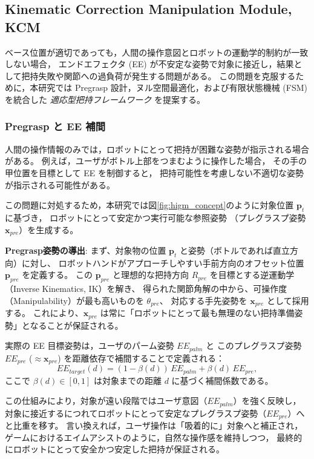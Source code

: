 \documentclass[../../main.tex]{subfiles} %
\begin{document}
\subsection{Kinematic Correction Manipulation Module, KCM}

ベース位置が適切であっても，人間の操作意図とロボットの運動学的制約が一致しない場合，
エンドエフェクタ (EE) が不安定な姿勢で対象に接近し，結果として把持失敗や関節への過負荷が発生する問題がある。
この問題を克服するために，本研究では Pregrasp 設計，ヌル空間最適化，および有限状態機械 (FSM) を統合した
\textit{適応型把持フレームワーク} を提案する。

\subsubsection{Pregrasp と EE 補間}
人間の操作情報のみでは，ロボットにとって把持が困難な姿勢が指示される場合がある。
例えば，ユーザがボトル上部をつまむように操作した場合，
その手の甲位置を目標として EE を制御すると，
把持可能性を考慮しない不適切な姿勢が指示される可能性がある。

この問題に対処するため，本研究では図\ref{fig:higm_concept}のように対象位置 $\mathbf{p}_t$ に基づき，
ロボットにとって安定かつ実行可能な参照姿勢
（プレグラスプ姿勢 $\mathbf{x}_{pre}$）を生成する。

\textbf{Pregrasp姿勢の導出}:
まず、対象物の位置 $\mathbf{p}_t$ と姿勢（ボトルであれば直立方向）に対し、
ロボットハンドがアプローチしやすい手前方向のオフセット位置 $\mathbf{p}_{pre}$ を定義する。
この $\mathbf{p}_{pre}$ と理想的な把持方向 $R_{pre}$ を目標とする逆運動学（Inverse Kinematics, IK）を解き、
得られた関節角解の中から、可操作度（Manipulability）が最も高いものを $\theta_{pre}$、
対応する手先姿勢を $\mathbf{x}_{pre}$ として採用する。
これにより、$\mathbf{x}_{pre}$ は常に「ロボットにとって最も無理のない把持準備姿勢」となることが保証される。

実際の EE 目標姿勢は，ユーザのパーム姿勢 $EE_{palm}$ と
このプレグラスプ姿勢 $EE_{pre}$ ($\approx \mathbf{x}_{pre}$) を距離依存で補間することで定義される：
\begin{equation}
EE_{target}(d) = (1-\beta(d)) \, EE_{palm} + \beta(d) \, EE_{pre},
\end{equation}
ここで $\beta(d) \in [0,1]$ は対象までの距離 $d$ に基づく補間係数である。

この仕組みにより，対象が遠い段階ではユーザ意図（$EE_{palm}$）を強く反映し，
対象に接近するにつれてロボットにとって安定なプレグラスプ姿勢（$EE_{pre}$）へと比重を移す。
言い換えれば，ユーザ操作は「吸着的に」対象へと補正され，
ゲームにおけるエイムアシストのように，自然な操作感を維持しつつ，
最終的にロボットにとって安全かつ安定した把持が保証される。
\end{document}
